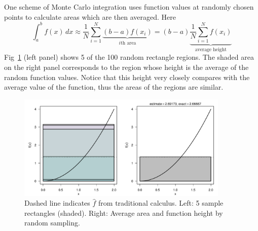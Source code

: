 \documentclass[11pt]{article}
\begin{document}
One scheme of Monte Carlo integration uses function values at randomly chosen points to calculate areas which are then averaged. Here \[\int_a^b f(x)\,dx \approx \dfrac{1}{N}\sum_{i=1}^{N} \underbrace{(b-a)f(x_i)}_\text{\(i\)th area} = (b-a)\underbrace{\dfrac{1}{N}\sum_{i=1}^{N} f(x_i)}_\text{average height}\] Fig~\ref{fig::average} (left panel) shows 5 of the 100 random rectangle regions. The shaded area on the right panel corresponds to the region whose height is the average of the random function values. Notice that this height very closely compares with the average value of the function, thus the areas of the regions are similar.
%
\begin{figure}[h!]\centering
\includegraphics[width=0.9\textwidth]{5_integration/rectangles.pdf}
\caption{Dashed line indicates \(\hat{f}\) from traditional calculus. Left: 5 sample rectangles (shaded). Right: Average area and function height by random sampling.}\label{fig::average}
\end{figure}
\end{document}
